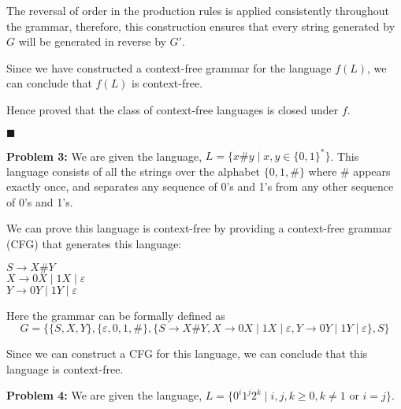 \documentclass[addpoints]{exam}
\begin{document}
\begin{questions}
\begin{solution}
    The reversal of order in the production rules is applied consistently throughout the grammar, therefore, this construction ensures that every string generated by $G$ will be generated in reverse by $G'$.

    Since we have constructed a context-free grammar for the language $f(L)$, we can conclude that $f(L)$ is context-free.

    Hence proved that the class of context-free languages is closed under $f$.
    \begin{flushright}
      $\blacksquare$
    \end{flushright}

    \newpage
    \textbf{Problem 3:}
    We are given the language, $L=\{ x\#y \mid x,y\in\{0,1\}^*\}$. This language consists of all the strings over the alphabet $ \{0, 1, \#\} $ where $ \# $ appears exactly once, and separates any sequence of 0's and 1's from any other sequence of 0's and 1's.

    We can prove this language is context-free by providing a context-free grammar (CFG) that generates this language:

    $ S \longrightarrow X\#Y $ \\
    $ X \longrightarrow 0X \mid 1X \mid \varepsilon $ \\
    $ Y \longrightarrow 0Y \mid 1Y \mid \varepsilon $

    Here the grammar can be formally defined as \vspace*{-2mm}
    $$ G = \{ \{ S, X, Y \}, \{ \varepsilon, 0, 1, \# \}, \{ S \rightarrow X\#Y, X \rightarrow 0X \mid 1X \mid \varepsilon, Y \rightarrow 0Y \mid 1Y \mid \varepsilon \}, S \} $$

    Since we can construct a CFG for this language, we can conclude that this language is context-free.

    \vspace*{5mm}
    \textbf{Problem 4:}
    We are given the language, $ L = \{ 0^i1^j2^k \mid i, j, k \geq 0, k \neq 1 \text{ or } i = j \} $.
\end{solution}
\end{questions}
\end{document}
